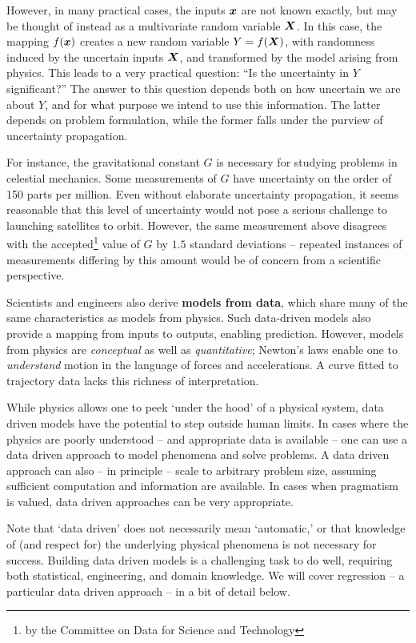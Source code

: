 \documentclass[../primer.tex]{subfiles}
\begin{document}
However, in many practical cases, the inputs $\boldsymbol{x}$ are not known exactly, but
may be thought of instead as a multivariate random variable $\boldsymbol{X}$. In this case,
the mapping $f(\boldsymbol{x})$ creates a new random variable $Y = f(\boldsymbol{X})$, with randomness
induced by the uncertain inputs $\boldsymbol{X}$, and transformed by the model arising from
physics. This leads to a very practical question: ``Is the uncertainty in $Y$
significant?'' The answer to this question depends both on how uncertain we are
about $Y$, and for what purpose we intend to use this information. The latter
depends on problem formulation, while the former falls under the purview of
uncertainty propagation.

For instance, the gravitational constant $G$ is necessary for studying problems
in celestial mechanics. Some measurements of $G$ have uncertainty on the order
of 150 parts per million.\cite{rosi2014precision} Even without elaborate
uncertainty propagation, it seems reasonable that this level of uncertainty
would not pose a serious challenge to launching satellites to orbit. However,
the same measurement above disagrees with the accepted\footnote{by the Committee
  on Data for Science and Technology} value of $G$ by $1.5$ standard deviations
-- repeated instances of measurements differing by this amount would be of
concern from a scientific perspective.

Scientists and engineers also derive \textbf{models from data}, which share many
of the same characteristics as models from physics. Such data-driven models also
provide a mapping from inputs to outputs, enabling prediction. However, models
from physics are \emph{conceptual} as well as \emph{quantitative}; Newton's laws
enable one to \emph{understand} motion in the language of forces and
accelerations. A curve fitted to trajectory data lacks this richness of
interpretation.

While physics allows one to peek `under the hood' of a physical system, data
driven models have the potential to step outside human limits. In cases where
the physics are poorly understood -- and appropriate data is available -- one
can use a data driven approach to model phenomena and solve problems. A data
driven approach can also -- in principle -- scale to arbitrary problem size,
assuming sufficient computation and information are available. In cases when
pragmatism is valued, data driven approaches can be very appropriate.

Note that `data driven' does not necessarily mean `automatic,' or that knowledge
of (and respect for) the underlying physical phenomena is not necessary for
success. Building data driven models is a challenging task to do well, requiring
both statistical, engineering, and domain knowledge. We will cover regression --
a particular data driven approach -- in a bit of detail below.
\end{document}
